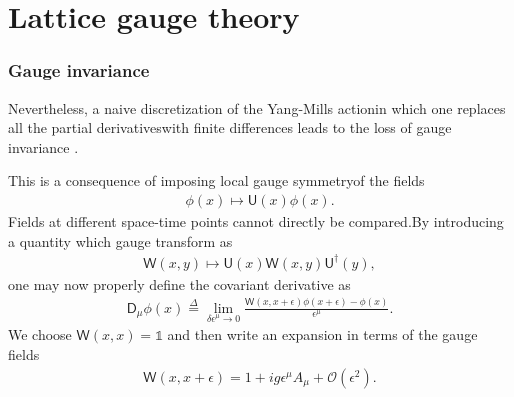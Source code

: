 \section{Lattice gauge theory}
\subsubsection*{Gauge invariance} 
Nevertheless, a naive discretization of the Yang-Mills actionin which one replaces all the partial derivativeswith finite differences leads to the loss of gauge invariance \cite{schwartz, peskin}. 

\begin{note}
This is a consequence of imposing local gauge symmetryof the fields
\begin{align*}
    \phi(x)\mapsto \textsf{U}(x)\phi(x).
\end{align*}
Fields at different space-time points cannot directly be compared.By introducing a quantity which gauge transform as
\begin{align}\label{latt3}
    \textsf{W}(x,y)\mapsto\textsf{U}(x)\textsf{W}(x,y)\textsf{U}^\dagger(y),
\end{align}
one may now properly define the covariant derivative as
\begin{align}\label{latt2}
    \textsf{D}_{\mu} \phi(x)\overset{\Delta}{=} \lim _{\delta \epsilon^{\mu} \rightarrow 0} \frac{\textsf{W}(x, x+\epsilon) \phi(x+\epsilon)-\phi(x)}{\epsilon^\mu}.
\end{align}
We choose $\textsf{W}(x,x)=\mathds{1}$ and then write an expansion in terms of the gauge fields
\begin{align*}
    \textsf{W}(x,x+\epsilon)=1+ig\epsilon^\mu A_\mu+\mathcal{O}(\epsilon^2).
\end{align*}
\end{note}

